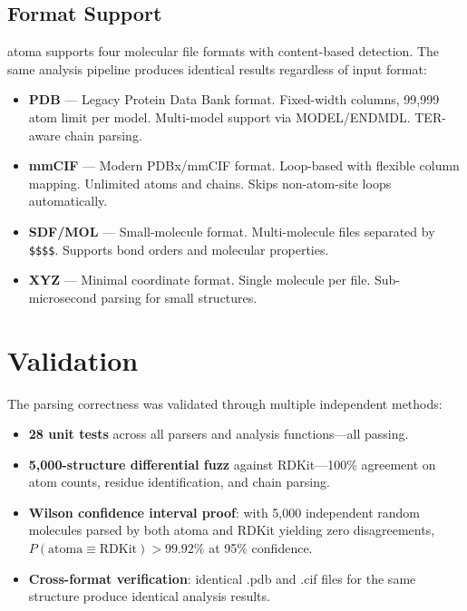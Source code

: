 \documentclass[11pt,a4paper]{article}
\begin{document}
\subsection{Format Support}

atoma supports four molecular file formats with content-based detection. The same analysis pipeline produces identical results regardless of input format:

\begin{itemize}[leftmargin=*]
  \item \textbf{PDB} --- Legacy Protein Data Bank format. Fixed-width columns, 99,999 atom limit per model. Multi-model support via MODEL/ENDMDL. TER-aware chain parsing.
  \item \textbf{mmCIF} --- Modern PDBx/mmCIF format. Loop-based with flexible column mapping. Unlimited atoms and chains. Skips non-atom-site loops automatically.
  \item \textbf{SDF/MOL} --- Small-molecule format. Multi-molecule files separated by \texttt{\$\$\$\$}. Supports bond orders and molecular properties.
  \item \textbf{XYZ} --- Minimal coordinate format. Single molecule per file. Sub-microsecond parsing for small structures.
\end{itemize}

\section{Validation}

The parsing correctness was validated through multiple independent methods:

\begin{itemize}[leftmargin=*]
  \item \textbf{28 unit tests} across all parsers and analysis functions---all passing.
  \item \textbf{5,000-structure differential fuzz} against RDKit---100\% agreement on atom counts, residue identification, and chain parsing.
  \item \textbf{Wilson confidence interval proof}: with 5,000 independent random molecules parsed by both atoma and RDKit yielding zero disagreements, $P(\text{atoma} \equiv \text{RDKit}) > 99.92\%$ at 95\% confidence.
  \item \textbf{Cross-format verification}: identical .pdb and .cif files for the same structure produce identical analysis results.
\end{itemize}
\end{document}
